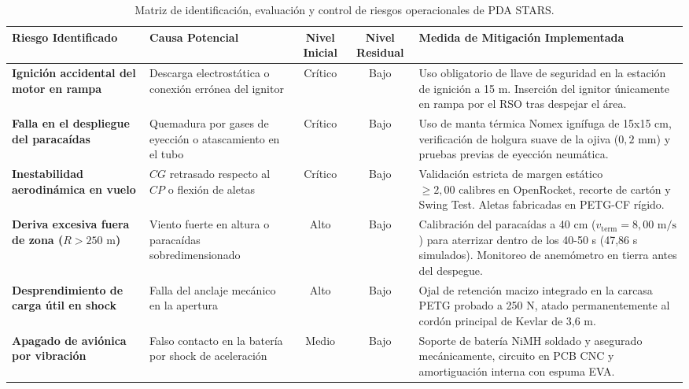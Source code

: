 \begin{table}[H]
\centering
\scriptsize
\begin{tabularx}{\linewidth}{p{2.8cm}p{2.8cm}ccX}
\toprule
\rowcolor{navyiejaga!15}
\textbf{Riesgo Identificado} & \textbf{Causa Potencial} & \textbf{Nivel Inicial} & \textbf{Nivel Residual} & \textbf{Medida de Mitigación Implementada} \\
\midrule
\textbf{Ignición accidental del motor en rampa} & Descarga electrostática o conexión errónea del ignitor & Crítico & Bajo & Uso obligatorio de llave de seguridad en la estación de ignición a 15 m. Inserción del ignitor únicamente en rampa por el RSO tras despejar el área. \\
\rowcolor{grisclaro}
\textbf{Falla en el despliegue del paracaídas} & Quemadura por gases de eyección o atascamiento en el tubo & Crítico & Bajo & Uso de manta térmica Nomex ignífuga de 15x15 cm, verificación de holgura suave de la ojiva ($0,2\text{ mm}$) y pruebas previas de eyección neumática. \\
\textbf{Inestabilidad aerodinámica en vuelo} & $CG$ retrasado respecto al $CP$ o flexión de aletas & Crítico & Bajo & Validación estricta de margen estático $\ge 2,00\text{ calibres}$ en OpenRocket, recorte de cartón y Swing Test. Aletas fabricadas en PETG-CF rígido. \\
\rowcolor{grisclaro}
\textbf{Deriva excesiva fuera de zona ($R > 250\text{ m}$)} & Viento fuerte en altura o paracaídas sobredimensionado & Alto & Bajo & Calibración del paracaídas a 40 cm ($v_{\text{term}} = 8,00\text{ m/s}$) para aterrizar dentro de los 40-50 s (47,86 s simulados). Monitoreo de anemómetro en tierra antes del despegue. \\
\textbf{Desprendimiento de carga útil en shock} & Falla del anclaje mecánico en la apertura & Alto & Bajo & Ojal de retención macizo integrado en la carcasa PETG probado a 250 N, atado permanentemente al cordón principal de Kevlar de 3,6 m. \\
\rowcolor{grisclaro}
\textbf{Apagado de aviónica por vibración} & Falso contacto en la batería por shock de aceleración & Medio & Bajo & Soporte de batería NiMH soldado y asegurado mecánicamente, circuito en PCB CNC y amortiguación interna con espuma EVA. \\
\bottomrule
\end{tabularx}
\caption{Matriz de identificación, evaluación y control de riesgos operacionales de PDA STARS.}
\label{tab:matriz_riesgos}
\end{table}

